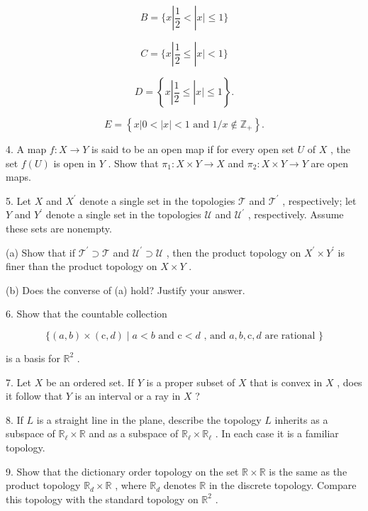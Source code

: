 \documentclass[10pt]{article}
\begin{document}
\[
B = \{ x\left| {\frac{1}{2} < }\right| x \mid   \leq  1\}
\]

\[
C = \{ x\left| {\frac{1}{2} \leq  }\right| x \mid   < 1\}
\]

\[
D = \left\{  {x\left| {\frac{1}{2} \leq  }\right| x \mid   \leq  1}\right\}  .
\]

\[
E = \left\{  {x\left| {0 < }\right| x \mid   < 1\text{ and }1/x \notin  {\mathbb{Z}}_{ + }}\right\}  .
\]

4. A map \(f : X \rightarrow  Y\) is said to be an open map if for every open set \(U\) of \(X\) , the set \(f\left( U\right)\) is open in \(Y\) . Show that \({\pi }_{1} : X \times  Y \rightarrow  X\) and \({\pi }_{2} : X \times  Y \rightarrow  Y\) are open maps.

5. Let \(X\) and \({X}^{\prime }\) denote a single set in the topologies \(\mathcal{T}\) and \({\mathcal{T}}^{\prime }\) , respectively; let \(Y\) and \({Y}^{\prime }\) denote a single set in the topologies \(\mathcal{U}\) and \({\mathcal{U}}^{\prime }\) , respectively. Assume these sets are nonempty.

(a) Show that if \({\mathcal{T}}^{\prime } \supset  \mathcal{T}\) and \({\mathcal{U}}^{\prime } \supset  \mathcal{U}\) , then the product topology on \({X}^{\prime } \times  {Y}^{\prime }\) is finer than the product topology on \(X \times  Y\) .

(b) Does the converse of (a) hold? Justify your answer.

6. Show that the countable collection

\[
\{ \left( {a,b}\right)  \times  \left( {\mathrm{c},d}\right)  \mid  a < b\text{ and }\mathrm{c} < d\text{ , and }a,b,\mathrm{c},d\text{ are rational }\}
\]

is a basis for \({\mathbb{R}}^{2}\) .

7. Let \(X\) be an ordered set. If \(Y\) is a proper subset of \(X\) that is convex in \(X\) , does it follow that \(Y\) is an interval or a ray in \(X\) ?

8. If \(L\) is a straight line in the plane, describe the topology \(L\) inherits as a subspace of \({\mathbb{R}}_{\ell } \times  \mathbb{R}\) and as a subspace of \({\mathbb{R}}_{\ell } \times  {\mathbb{R}}_{\ell }\) . In each case it is a familiar topology.

9. Show that the dictionary order topology on the set \(\mathbb{R} \times  \mathbb{R}\) is the same as the product topology \({\mathbb{R}}_{d} \times  \mathbb{R}\) , where \({\mathbb{R}}_{d}\) denotes \(\mathbb{R}\) in the discrete topology. Compare this topology with the standard topology on \({\mathbb{R}}^{2}\) .
\end{document}
